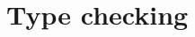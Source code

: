 \documentclass[../main.tex]{subfiles}
\begin{document}
\chapter{Type checking}\label{c:typechecking}
\end{document}
